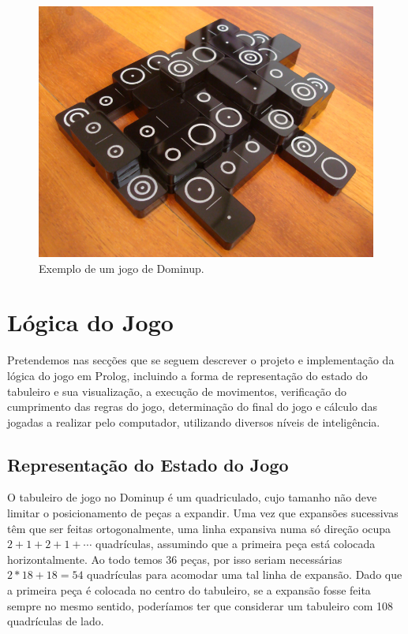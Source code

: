 \documentclass[a4paper]{article}
\begin{document}
\begin{figure}[htbp]
\begin{center}
\includegraphics[scale=0.4]{example.jpg}
\caption{Exemplo de um jogo de Dominup.}
\label{example}
\end{center}
\end{figure}



\section{Lógica do Jogo}

Pretendemos nas secções que se seguem descrever o projeto e implementação da lógica do jogo em Prolog, incluindo a forma de representação do estado do tabuleiro e sua visualização, a execução de movimentos, verificação do cumprimento das regras do jogo, determinação do final do jogo e cálculo das jogadas a realizar pelo computador, utilizando diversos níveis de inteligência. 

\subsection{Representação do Estado do Jogo} 

O tabuleiro de jogo no Dominup é um quadriculado, cujo tamanho não deve limitar o posicionamento de peças a expandir. Uma vez que expansões sucessivas têm que ser feitas ortogonalmente, uma linha expansiva numa só direção ocupa $2 + 1 + 2 + 1 + \cdots$ quadrículas, assumindo que a primeira peça está colocada horizontalmente. Ao todo temos 36 peças, por isso seriam necessárias $2 * 18 + 18 = 54$ quadrículas para acomodar uma tal linha de expansão. Dado que a primeira peça é colocada no centro do tabuleiro, se a expansão fosse feita sempre no mesmo sentido, poderíamos ter que considerar um tabuleiro com 108 quadrículas de lado.
\end{document}
